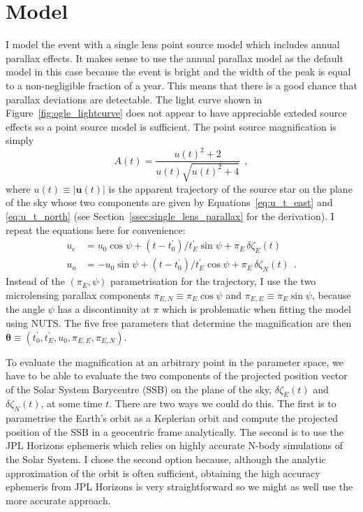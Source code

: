 \documentclass[12pt,dvipsnames]{report}
\newcommand{\ssf}[1]{\textsf{#1}}
\renewcommand{\vec}[1]{\boldsymbol{\mathbf{#1}}}
\newcommand{\hquad}{~~}
\begin{document}
\section{Model}
\label{sec:model_single_lens}
I model the event with a single lens point source model which includes annual parallax 
effects. It makes sense to use the annual parallax model as the default model in this case because 
the event is bright and the width of the peak is equal to a non-negligible fraction 
of a year. This means that there is a good chance that parallax deviations are detectable. 
The light curve shown in Figure~\ref{fig:ogle_lightcurve} does not appear to have appreciable 
exteded source effects so a point source model is sufficient.
The point source magnification is simply 
\begin{equation}
    A(t) = \frac{u(t)^2 + 2}{u(t)  \sqrt{u(t)^2 + 4}}
    \hquad,
\end{equation}
where $u(t)\equiv |\vec u(t)|$ is the apparent trajectory of the source star on the plane 
of the sky whose two components are given by Equations~\ref{eq:u_t_east} and 
\ref{eq:u_t_north} (see Section~\ref{ssec:single_lens_parallax} for the derivation). I 
repeat the equations here for convenience:
\begin{align}
    u_e & =u_0\cos\psi + (t-t_0^\prime)/t_E^\prime\sin\psi + \pi_E\,\delta\zeta_E(t)  \\
    u_n & =-u_0\sin\psi + (t-t_0^\prime)/t_E^\prime\cos\psi + \pi_E\,\delta\zeta_N(t)
    \hquad.
\end{align}
Instead of the $(\pi_E, \psi)$ parametrisation for the trajectory, I use the two 
microlensing parallax components $\pi_{E,N}\equiv\pi_E\cos\psi$ and 
$\pi_{E,E}\equiv\pi_E\sin\psi$, because the angle $\psi$ has a discontinuity at $\pi$ 
which is problematic when fitting the model using NUTS. 
The five free parameters that determine the 
magnification are then $\vec\theta\equiv(t_0^\prime, t_E^\prime, u_0, \pi_{E,E}, \pi_{E,N})$.

To evaluate the magnification at an arbitrary point in the parameter space, we have 
to be able to evaluate the two components of the projected position vector of the 
Solar System Barycentre (SSB) on the plane of the sky, $\delta\zeta_E(t)$ and 
$\delta\zeta_N(t)$, at some time $t$. 
There are two ways we could do this. The first is to parametrise the Earth's orbit 
as a Keplerian orbit and compute the projected position of the SSB in a geocentric 
frame analytically. The second is to use the \ssf{JPL Horizons} ephemeris which 
relies on highly accurate N-body simulations of the Solar System.
I chose the second option because, although the analytic approximation of the orbit 
is often sufficient, obtaining the high accuracy ephemeris from \ssf{JPL Horizons} is very 
straightforward so we might as well use the more accurate approach. 
\end{document}
